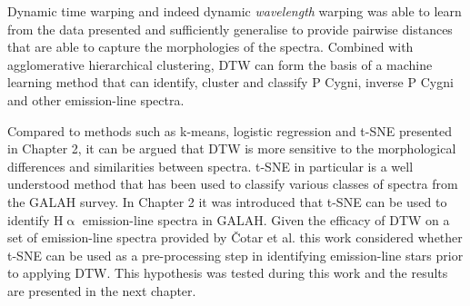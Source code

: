 Dynamic time warping and indeed dynamic \emph{wavelength} warping was able to learn from the data presented and sufficiently generalise to provide pairwise distances that are able to capture the morphologies of the spectra. Combined with agglomerative hierarchical clustering, DTW can form the basis of a machine learning method that can identify, cluster and classify P Cygni, inverse P Cygni and other emission-line spectra.

Compared to methods such as k-means, logistic regression and t-SNE presented in Chapter 2, it can be argued that DTW is more sensitive to the morphological differences and similarities between spectra. t-SNE in particular is a well understood method that has been used to classify various classes of spectra from the GALAH survey. In Chapter 2 it was introduced that t-SNE can be used to identify H$\upalpha$ emission-line spectra in GALAH. Given the efficacy of DTW on a set of emission-line spectra provided by Čotar et al. this work considered whether t-SNE can be used as a pre-processing step in identifying emission-line stars prior to applying DTW. This hypothesis was tested during this work and the results are presented in the next chapter. 








